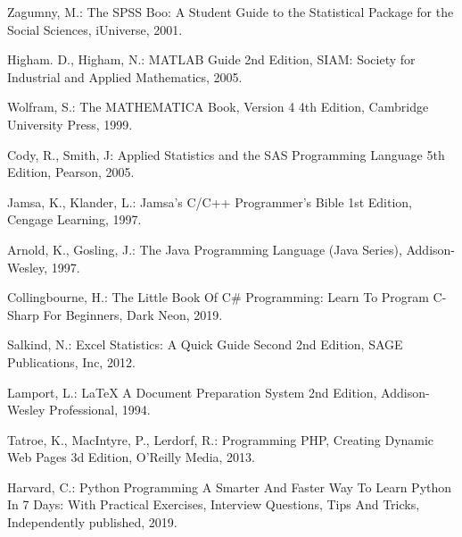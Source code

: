\documentclass[runningheads,14pt,a4paper,openany]{book}
\begin{document}
\newpage
{}

\newpage
\listoftables
{}

\pagestyle{fancy}














\newpage
\begin{thebibliography}{99}

 Zagumny, M.: The SPSS Boo: A Student Guide to the Statistical Package for the Social Sciences, iUniverse, 2001.

 Higham. D., Higham, N.: MATLAB Guide 2nd Edition, SIAM: Society for Industrial and Applied Mathematics, 2005.

 Wolfram, S.: The MATHEMATICA Book, Version 4 4th Edition, Cambridge University Press, 1999.

 Cody, R., Smith, J: Applied Statistics and the SAS Programming Language 5th Edition, Pearson, 2005.

 Jamsa, K., Klander, L.: Jamsa's C/C++ Programmer's Bible 1st Edition, Cengage Learning, 1997.

 Arnold, K.,  Gosling, J.: The Java Programming Language (Java Series), Addison-Wesley, 1997.

 Collingbourne, H.: The Little Book Of C\# Programming: Learn To Program C-Sharp For Beginners, Dark Neon, 2019.

 Salkind, N.: Excel Statistics: A Quick Guide Second 2nd Edition, SAGE Publications, Inc, 2012.

 Lamport, L.: LaTeX A Document Preparation System 2nd Edition, Addison-Wesley Professional, 1994.

 Tatroe, K., MacIntyre, P., Lerdorf, R.: Programming PHP, Creating Dynamic Web Pages 3d Edition, O'Reilly Media, 2013.

 Harvard, C.: Python Programming A Smarter And Faster Way To Learn Python In 7 Days: With Practical Exercises, Interview Questions, Tips And Tricks, Independently published, 2019.


\end{thebibliography}
\end{document}

